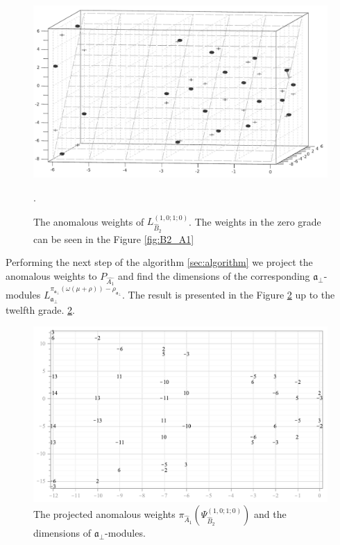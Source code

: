 \documentclass[a4paper,12pt]{article}
\theoremstyle{definition} \newtheorem{Def}{Definition}
\begin{document}
\begin{figure}[h!tb]
  \includegraphics[width=140mm]{AffineB2_A1_Anom.pdf}
  \caption{The anomalous weights of $L^{(1,0;1;0)}_{\hat B_2 }$.
  The weights in the zero grade can be seen in the Figure \ref{fig:B2_A1}}.
  \label{fig:affine_B2_anom_point}
\end{figure}

Performing the next step of the algorithm \ref{sec:algorithm} we project the anomalous weights to
$P_{\hat{A_1}}$ and find the dimensions of the corresponding
$\mathfrak{a}_{\bot}$-modules $L^{\pi_{\mathfrak{a}_{\bot}}(\omega(\mu+\rho))-\rho_{\mathfrak{a}_{\bot}}}_{\mathfrak{a}_{\bot}}$.
The result is presented in the Figure
\ref{fig:AffineB2_A1_anom_proj} up to the twelfth grade.
\ref{fig:AffineB2_A1_anom_proj}.
\begin{figure}[p]
  \centering
  \includegraphics[width=120mm]{AffineB2_A1_proj_anom.pdf}
  \caption{The projected anomalous weights $\pi_{\hat A_1}\left(\Psi^{(1,0;1;0)}_{\hat B_2}\right)$ and the dimensions of $\mathfrak{a}_{\bot}$-modules.}
  \label{fig:AffineB2_A1_anom_proj}
\end{figure}
\end{document}
